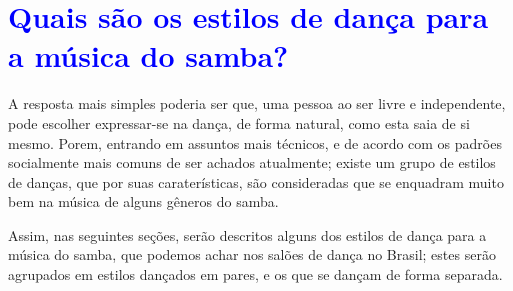 \section{\textcolor{blue}{Quais são os estilos de dança para a música do samba?}}
\label{subsec:estilosdedanca}
A resposta mais simples poderia ser que, uma pessoa ao ser livre e independente,
pode escolher expressar-se na dança, de forma natural, como esta saia de si mesmo.
Porem, entrando em assuntos mais técnicos, 
e de acordo com os padrões socialmente mais comuns de ser achados atualmente;
existe um grupo de estilos de danças, que por suas caraterísticas, 
são consideradas que se enquadram muito bem na música de alguns gêneros do samba.

Assim, nas seguintes seções, serão descritos alguns dos estilos de dança para a música do samba,  
que podemos achar nos salões de dança no Brasil;
estes serão agrupados em estilos dançados em pares, e os que se dançam de forma separada. 

